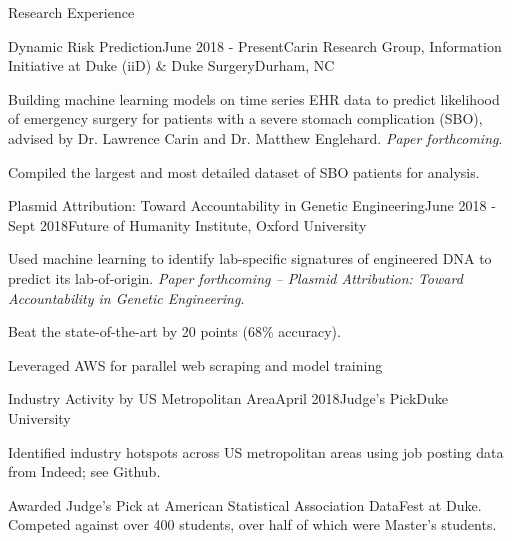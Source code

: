 \documentclass{resume} %
\begin{document}
\begin{rSection}{Research Experience}

\begin{rSubsection}{Dynamic Risk Prediction}{June 2018 - Present}{Carin Research Group, Information Initiative at Duke (iiD) \& Duke Surgery}{Durham, NC}
\item Building machine learning models on time series EHR data to predict likelihood of emergency surgery for patients with a severe stomach complication (SBO), advised by Dr. Lawrence Carin and Dr. Matthew Englehard. \textit{Paper forthcoming}.
\item Compiled the largest and most detailed dataset of SBO patients for analysis.
\end{rSubsection}

\begin{rSubsection}{Plasmid Attribution: Toward Accountability in Genetic Engineering}{June 2018 - Sept 2018}{Future of Humanity Institute, Oxford University}{}
\item Used machine learning to identify lab-specific signatures of engineered DNA to predict its lab-of-origin. \textit{Paper forthcoming -- Plasmid Attribution: Toward Accountability in Genetic Engineering}.
\item Beat the state-of-the-art by 20 points (68\% accuracy).
\item Leveraged AWS for parallel web scraping and model training
\end{rSubsection}

\begin{rSubsection}{Industry Activity by US Metropolitan Area}{April 2018}{Judge's Pick}{Duke University}
\item Identified industry hotspots across US metropolitan areas using job posting data from Indeed; see Github.
\item Awarded Judge's Pick at American Statistical Association DataFest at Duke. Competed against over 400 students, over half of which were Master's students.
\end{rSubsection}

\end{rSection}


\end{document}
